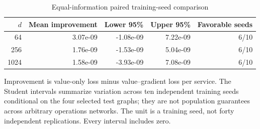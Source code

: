 \begin{table}[!ht]
\centering
\caption{Equal-information paired training-seed comparison}\label{tab:seed-uncertainty}
\begin{tabular}{rrrrr}\toprule
$d$ & Mean improvement & Lower 95\% & Upper 95\% & Favorable seeds\\
\midrule
64 & 3.07e-09 & -1.08e-09 & 7.22e-09 & 6/10\\
256 & 1.76e-09 & -1.53e-09 & 5.04e-09 & 6/10\\
1024 & 1.58e-09 & -3.93e-09 & 7.08e-09 & 6/10\\
\bottomrule\end{tabular}
\par\smallskip\begin{minipage}{.98\textwidth}\small Improvement is value-only loss minus value--gradient loss per service. The Student intervals summarize variation across ten independent training seeds conditional on the four selected test graphs; they are not population guarantees across arbitrary operations networks. The unit is a training seed, not forty independent replications. Every interval includes zero.\end{minipage}
\end{table}
